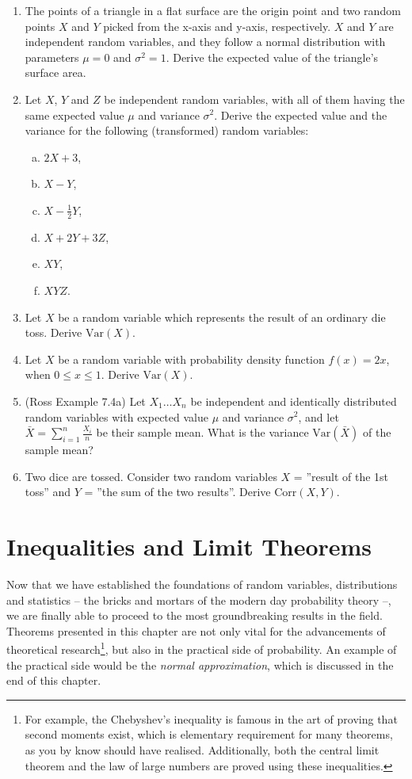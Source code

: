 \documentclass[12pt,a4paper,leqno]{report}
\newcommand{\var}{\mathrm{Var}}
\newcommand{\corr}{\mathrm{Corr}}
\theoremstyle{plain}
\theoremstyle{definition}
\begin{document}
\begin{enumerate}
\item The points of a triangle in a flat surface are the origin point and two random points $X$ and $Y$ picked from the x-axis and y-axis, respectively. $X$ and $Y$ are independent random variables, and they follow a normal distribution with parameters $\mu = 0$ and $\sigma^2 = 1$. Derive the expected value of the triangle's surface area.
\item Let $X$, $Y$ and $Z$ be independent random variables, with all of them having the same expected value $\mu$ and variance $\sigma^2$. Derive the expected value and the variance for the following (transformed) random variables:
\begin{enumerate}[(a)]
\item $2X + 3$,
\item $X - Y$,
\item $X - \frac{1}{2}Y$,
\item $X + 2Y + 3Z$,
\item $XY$,
\item $XYZ$.
\end{enumerate}
\item Let $X$ be a random variable which represents the result of an ordinary die toss. Derive $\var(X)$.
\item Let $X$ be a random variable with probability density function $f(x) = 2x$, when $0 \leq x \leq 1$. Derive $\var(X)$. 
\item (Ross Example 7.4a) Let $X_1 \ldots X_n$ be independent and identically distributed random variables with expected value $\mu$ and variance $\sigma^2$, and let $\bar{X} = \sum_{i=1}^n \frac{X_i}{n}$ be their sample mean. What is the variance $\var(\bar{X})$ of the sample mean?
\item Two dice are tossed. Consider two random variables $X$ = ''result of the 1st toss'' and $Y$ = ''the sum of the two results''. Derive $\corr(X, Y)$. 
\end{enumerate}


\chapter{Inequalities and Limit Theorems}\label{limit}

Now that we have established the foundations of random variables, distributions and statistics -- the bricks and mortars of the modern day probability theory --, we are finally able to proceed to the most groundbreaking results in the field. Theorems presented in this chapter are not only vital for the advancements of theoretical research\footnote{For example, the Chebyshev's inequality is famous in the art of proving that second moments exist, which is elementary requirement for many theorems, as you by know should have realised. Additionally, both the central limit theorem and the law of large numbers are proved using these inequalities.}, but also in the practical side of probability. An example of the practical side would be the \emph{normal approximation}, which is discussed in the end of this chapter.
\end{document}
